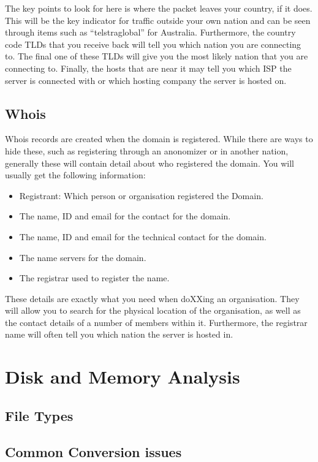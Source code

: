 			The key points to look for here is where the packet leaves your country, if it does. 
			This will be the key indicator for traffic outside your own nation and can be seen through items such as ``telstraglobal'' for Australia. 
			Furthermore, the country code TLDs that you receive back will tell you which nation you are connecting to. 
			The final one of these TLDs will give you the most likely nation that you are connecting to. 
			Finally, the hosts that are near it may tell you which ISP the server is connected with or which hosting company the server is hosted on. 

		\subsection{Whois}
			Whois records are created when the domain is registered. 
			While there are ways to hide these, such as registering through an anonomizer or in another nation, generally these will contain detail about who registered the domain. 
			You will usually get the following information:
			\begin{itemize}
				\item Registrant: Which person or organisation registered the Domain. 
				\item The name, ID and email for the contact for the domain. 
				\item The name, ID and email for the technical contact for the domain.
				\item The name servers for the domain.
				\item The registrar used to register the name. 
			\end{itemize}
			These details are exactly what you need when doXXing an organisation. 
			They will allow you to search for the physical location of the organisation, as well as the contact details of a number of members within it. 
			Furthermore, the registrar name will often tell you which nation the server is hosted in. 
	\section{Disk and Memory Analysis}
		\subsection{File Types}
		\subsection{Common Conversion issues}
